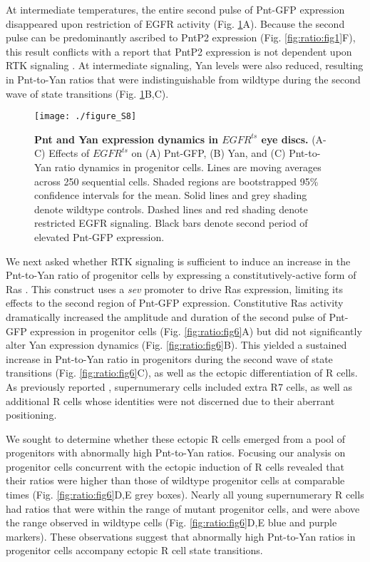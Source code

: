 At intermediate temperatures, the entire second pulse of Pnt-GFP expression disappeared upon restriction of EGFR activity (Fig. \ref{fig:ratio:figS8}A). Because the second pulse can be predominantly ascribed to PntP2 expression (Fig. \ref{fig:ratio:fig1}F), this result conflicts with a report that PntP2 expression is not dependent upon RTK signaling \cite{Shwartz2013}. At intermediate signaling, Yan levels were also reduced, resulting in Pnt-to-Yan ratios that were indistinguishable from wildtype during the second wave of state transitions (Fig. \ref{fig:ratio:figS8}B,C).

\begin{figure}[h]
\centering
\texttt{[image: ./figure\_S8]}
\caption[Pnt and Yan expression dynamics in $EGFR^{ts}$ eye discs.]{\textbf{Pnt and Yan expression dynamics in $EGFR^{ts}$ eye discs.} (A-C) Effects of $EGFR^{ts}$ on (A) Pnt-GFP, (B) Yan, and (C) Pnt-to-Yan ratio dynamics in progenitor cells. Lines are moving averages across 250 sequential cells. Shaded regions are bootstrapped 95\% confidence intervals for the mean. Solid lines and grey shading denote wildtype controls. Dashed lines and red shading denote restricted EGFR signaling. Black bars denote second period of elevated Pnt-GFP expression.}
\label{fig:ratio:figS8}
\end{figure}

We next asked whether RTK signaling is sufficient to induce an increase in the Pnt-to-Yan ratio of progenitor cells by expressing a constitutively-active form of Ras \cite{Simon1991,Fortini1992}. This construct uses a \textit{sev} promoter to drive Ras expression, limiting its effects to the second region of Pnt-GFP expression. Constitutive Ras activity dramatically increased the amplitude and duration of the second pulse of Pnt-GFP expression in progenitor cells (Fig. \ref{fig:ratio:fig6}A) but did not significantly alter Yan expression dynamics (Fig. \ref{fig:ratio:fig6}B). This yielded a sustained increase in Pnt-to-Yan ratio in progenitors during the second wave of state transitions (Fig. \ref{fig:ratio:fig6}C), as well as the ectopic differentiation of R cells. As previously reported \cite{Fortini1992}, supernumerary cells included extra R7 cells, as well as additional R cells whose identities were not discerned due to their aberrant positioning.

We sought to determine whether these ectopic R cells emerged from a pool of progenitors with abnormally high Pnt-to-Yan ratios. Focusing our analysis on progenitor cells concurrent with the ectopic induction of R cells revealed that their ratios were higher than those of wildtype progenitor cells at comparable times (Fig. \ref{fig:ratio:fig6}D,E grey boxes). Nearly all young supernumerary R cells had ratios that were within the range of mutant progenitor cells, and were above the range observed in wildtype cells (Fig. \ref{fig:ratio:fig6}D,E blue and purple markers). These observations suggest that abnormally high Pnt-to-Yan ratios in progenitor cells accompany ectopic R cell state transitions.

